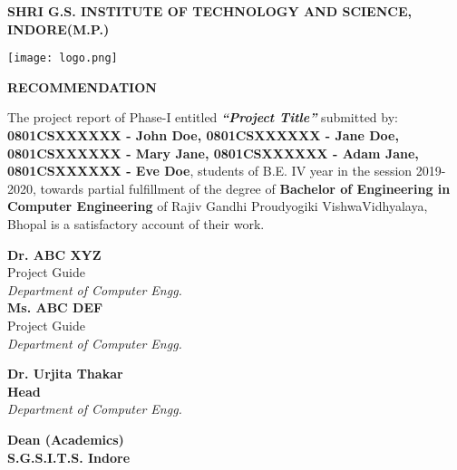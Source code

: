 \pagestyle{plain}
\large
\begin{center}
    


\textbf{SHRI G.S. INSTITUTE OF TECHNOLOGY AND SCIENCE, INDORE(M.P.)\\}

\vspace*{0.7cm}

\texttt{[image: logo.png]}

\vspace*{0.7cm}
\normalfont\LARGE\centering
\textbf{RECOMMENDATION} \\
\end{center}
\normalsize
The project report of Phase-I entitled \emph{\textbf{``Project Title''}} submitted by:
\textbf{
0801CSXXXXXX - John Doe,
0801CSXXXXXX - Jane Doe, 
0801CSXXXXXX - Mary Jane, 
0801CSXXXXXX - Adam Jane, 
0801CSXXXXXX - Eve Doe},
students of B.E. IV year in the session 2019-2020, towards partial fulfillment of the degree of \textbf{Bachelor of Engineering in Computer Engineering} of Rajiv Gandhi Proudyogiki VishwaVidhyalaya, Bhopal is a satisfactory account of their work.



\begin{minipage}[t]{0.45\textwidth}
    \flushleft
    \vspace*{2cm}
    \textbf{Dr. ABC XYZ} \\
    Project Guide \\
    \emph{Department of Computer Engg.} \\
    \vspace*{2cm}
    \textbf{Ms. ABC DEF} \\
    Project Guide \\
    \emph{Department of Computer Engg.} \\
\end{minipage}
    \hfill
\begin{minipage}[t]{0.45\textwidth}
    \flushleft
    \vspace{2cm}
    \textbf{Dr. Urjita Thakar} \\
    \textbf{Head} \\
    \emph{Department of Computer Engg.} \\
    \vspace*{2.6cm}
    
    
    
\end{minipage}
    
    \vspace*{\fill}
    \begin{center}
    \textbf{Dean (Academics) \\
    S.G.S.I.T.S. Indore \\}    
    \end{center}
    


